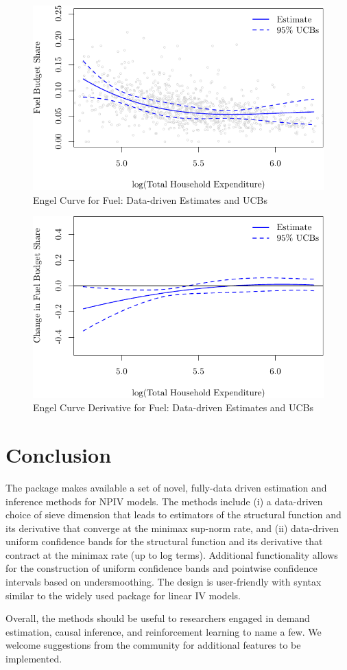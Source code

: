 \documentclass[
]{jss}
\begin{document}
\begin{figure}
\centering
\includegraphics{npiv_files/figure-latex/fuel-dd-1.pdf}
\caption{Engel Curve for Fuel: Data-driven Estimates and UCBs}
\end{figure}

\begin{figure}
\centering
\includegraphics{npiv_files/figure-latex/fuel-dd-deriv-1.pdf}
\caption{Engel Curve Derivative for Fuel: Data-driven Estimates and
UCBs}
\end{figure}

\newpage

\section{Conclusion}\label{conclusion}

The package  makes available a set of novel, fully-data driven
estimation and inference methods for NPIV models. The methods include
(i) a data-driven choice of sieve dimension that leads to estimators of
the structural function and its derivative that converge at the minimax
sup-norm rate, and (ii) data-driven uniform confidence bands for the
structural function and its derivative that contract at the minimax rate
(up to log terms). Additional functionality allows for the construction
of uniform confidence bands and pointwise confidence intervals based on
undersmoothing. The design is user-friendly with syntax similar to the
widely used package  \citep{IVREG} for linear IV models.

Overall, the methods should be useful to researchers engaged in demand
estimation, causal inference, and reinforcement learning to name a few.
We welcome suggestions from the community for additional features to be
implemented.


\end{document}
